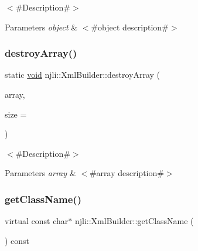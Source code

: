$<$\#\+Description\#$>$


\begin{DoxyParams}{Parameters}
{\em object} & $<$\#object description\#$>$ \\
\hline
\end{DoxyParams}
\mbox{\label{classnjli_1_1_xml_builder_a40786e323c4f939eeb024002bad0e156}} 
\subsubsection{\texorpdfstring{destroy\+Array()}{destroyArray()}}
{\footnotesize\ttfamily static \mbox{\hyperlink{_thread_8h_af1e856da2e658414cb2456cb6f7ebc66}{void}} njli\+::\+Xml\+Builder\+::destroy\+Array (\begin{DoxyParamCaption}\item[{\mbox{\hyperlink{classnjli_1_1_xml_builder}{Xml\+Builder}} $\ast$$\ast$}]{array,  }\item[{const \mbox{\hyperlink{_util_8h_a10e94b422ef0c20dcdec20d31a1f5049}{u32}}}]{size = {} }\end{DoxyParamCaption})\hspace{0.3cm}{\ttfamily [static]}}

$<$\#\+Description\#$>$


\begin{DoxyParams}{Parameters}
{\em array} & $<$\#array description\#$>$ \\
\hline
\end{DoxyParams}
\mbox{\label{classnjli_1_1_xml_builder_abc73a585be6b58a8e7d066bb513eee8c}} 
\subsubsection{\texorpdfstring{get\+Class\+Name()}{getClassName()}}
{\footnotesize\ttfamily virtual const char$\ast$ njli\+::\+Xml\+Builder\+::get\+Class\+Name (\begin{DoxyParamCaption}{ }\end{DoxyParamCaption}) const\hspace{0.3cm}{\ttfamily [virtual]}}

